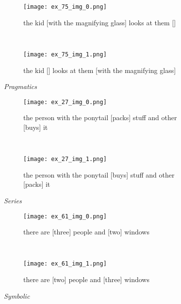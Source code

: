 \documentclass[10pt,twocolumn,letterpaper]{article}
\begin{document}
\begin{figure}
    \centering
        \begin{minipage}{.15\textwidth}
            \begin{subfigure}{\textwidth}
            \centering
            \texttt{[image: ex\_75\_img\_0.png]}
            \caption{the kid [with the magnifying glass] looks at them []}
            \end{subfigure}\\
            \begin{subfigure}{\textwidth}
            \centering
            \texttt{[image: ex\_75\_img\_1.png]}
            \caption{the kid [] looks at them [with the magnifying glass]}
            \end{subfigure}\caption*{\textit{Pragmatics}}
        \end{minipage}
        \hfill
        \begin{minipage}{.15\textwidth}
            \begin{subfigure}{\textwidth}
            \centering
            \texttt{[image: ex\_27\_img\_0.png]}
            \caption{the person with the ponytail [packs] stuff and other [buys] it}
            \end{subfigure}\\
            \begin{subfigure}{\textwidth}
            \centering
            \texttt{[image: ex\_27\_img\_1.png]}
            \caption{the person with the ponytail [buys] stuff and other [packs] it}
            \end{subfigure}\caption*{\textit{Series}}
        \end{minipage}
        \hfill
        \begin{minipage}{.15\textwidth}
            \begin{subfigure}{\textwidth}
            \centering
            \texttt{[image: ex\_61\_img\_0.png]}
            \caption{there are [three] people and [two] windows}
            \end{subfigure}\\
            \begin{subfigure}{\textwidth}
            \centering
            \texttt{[image: ex\_61\_img\_1.png]}
            \caption{there are [two] people and [three] windows}
            \end{subfigure}\caption*{\textit{Symbolic}}
        \end{minipage}

\end{figure}
\end{document}
